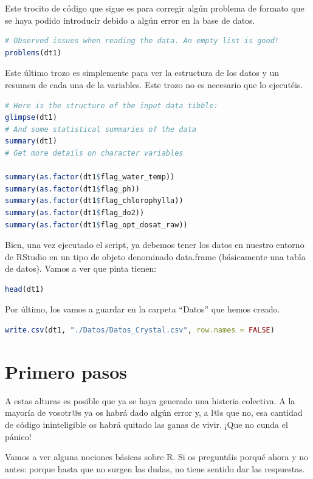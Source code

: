 \documentclass[
]{book}
\begin{document}
Este trocito de código que sigue es para corregir algún problema de formato que se haya podido introducir debido a algún error en la base de datos.

\begin{lstlisting}[language=R]
# Observed issues when reading the data. An empty list is good!
problems(dt1) 
\end{lstlisting}

Este último trozo es simplemente para ver la estructura de los datos y un resumen de cada una de la variables. Este trozo no es necesario que lo ejecutéis.

\begin{lstlisting}[language=R]
# Here is the structure of the input data tibble: 
glimpse(dt1) 
# And some statistical summaries of the data 
summary(dt1) 
# Get more details on character variables

summary(as.factor(dt1$flag_water_temp)) 
summary(as.factor(dt1$flag_ph)) 
summary(as.factor(dt1$flag_chlorophylla)) 
summary(as.factor(dt1$flag_do2)) 
summary(as.factor(dt1$flag_opt_dosat_raw))
\end{lstlisting}

Bien, una vez ejecutado el script, ya debemos tener los datos en nuestro entorno de RStudio en un tipo de objeto denominado data.frame (básicamente una tabla de datos). Vamos a ver que pinta tienen:

\begin{lstlisting}[language=R]
head(dt1)
\end{lstlisting}

Por último, los vamos a guardar en la carpeta ``Datos'' que hemos creado.

\begin{lstlisting}[language=R]
write.csv(dt1, "./Datos/Datos_Crystal.csv", row.names = FALSE)
\end{lstlisting}

\hypertarget{PrimerosPasos}{%
\chapter{Primero pasos}\label{PrimerosPasos}}

A estas alturas es posible que ya se haya generado una histeria colectiva. A la mayoría de vosotr@s ya os habrá dado algún error y, a l@s que no, esa cantidad de código ininteligible os habrá quitado las ganas de vivir. ¡Que no cunda el pánico!

Vamos a ver alguna nociones básicas sobre R. Si os preguntáis porqué ahora y no antes: porque hasta que no surgen las dudas, no tiene sentido dar las respuestas.
\end{document}
